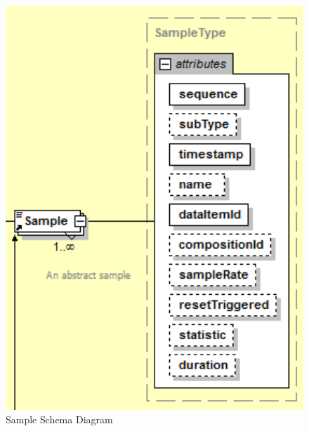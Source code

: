 \begin{figure}[ht]
  \centering
    \includegraphics[width=1.0\textwidth]{figures/Sample Schema.png}
  \caption{Sample Schema Diagram}
  \label{fig:Sample Schema Diagram}
\end{figure}

\FloatBarrier


